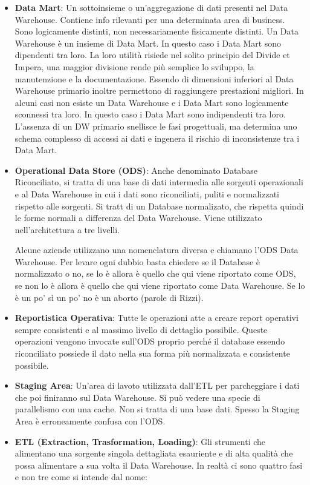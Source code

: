 \begin{itemize}
	\item \textbf{Data Mart}: Un sottoinsieme o un'aggregazione di dati presenti nel Data Warehouse. Contiene info rilevanti per una determinata area di business. Sono logicamente distinti, non necessariamente fisicamente distinti. Un Data Warehouse è un insieme di Data Mart. In questo caso i Data Mart sono dipendenti tra loro. La loro utilità risiede nel solito principio del Divide et Impera, una maggior divisione rende più semplice lo sviluppo, la manutenzione e la documentazione. Essendo di dimensioni inferiori al Data Warehouse primario inoltre permettono di raggiungere prestazioni migliori. In alcuni casi non esiste un Data Warehouse e i Data Mart sono logicamente sconnessi tra loro. In questo caso i Data Mart sono indipendenti tra loro. L’assenza di un DW primario snellisce le fasi progettuali, ma determina uno schema complesso di accessi ai dati e ingenera il rischio di inconsistenze tra i Data Mart.
	\item \textbf{Operational Data Store (ODS)}: Anche denominato Database Riconciliato, si tratta di una base di dati intermedia alle sorgenti operazionali e al Data Warehouse in cui i dati sono riconciliati, puliti e normalizzati rispetto alle sorgenti. Si tratt di un Database normalizato, che rispetta quindi le forme normali a differenza del Data Warehouse. Viene utilizzato nell'architettura a tre livelli.
	\begin{warn}[Nota:]
		Alcune aziende utilizzano una nomenclatura diversa e chiamano l'ODS Data Warehouse. Per levare ogni dubbio basta chiedere se il Database è normalizzato o no, se lo è allora è quello che qui viene riportato come ODS, se non lo è allora è quello che qui viene riportato come Data Warehouse. Se lo è un po' sì un po' no è un aborto (parole di Rizzi).
	\end{warn}
	\item \textbf{Reportistica Operativa}: Tutte le operazioni atte a creare report operativi sempre consistenti e al massimo livello di dettaglio possibile. Queste operazioni vengono invocate sull'ODS proprio perché il database essendo riconciliato possiede il dato nella sua forma più normalizzata e consistente possibile.
	\item \textbf{Staging Area}: Un'area di lavoto utilizzata dall'ETL per parcheggiare i dati che poi finiranno sul Data Warehouse. Si può vedere una specie di parallelismo con una cache. Non si tratta di una base dati. Spesso la Staging Area è erroneamente confusa con l’ODS.
	\item \textbf{ETL (Extraction, Trasformation, Loading)}: Gli strumenti che alimentano una sorgente singola dettagliata esauriente e di alta qualità che possa alimentare a sua volta il Data Warehouse. In realtà ci sono quattro fasi e non tre come si intende dal nome:

\end{itemize}
